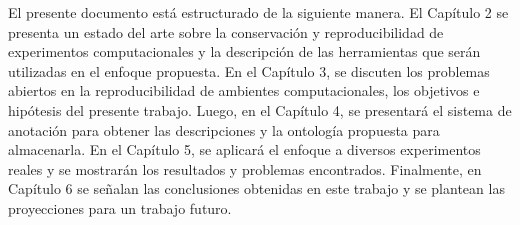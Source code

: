 El presente documento está estructurado de la siguiente manera. 
El Capítulo 2 se presenta un estado del arte sobre la conservación y reproducibilidad de experimentos computacionales y la descripción de las herramientas que serán utilizadas en el enfoque propuesta.
En el Capítulo 3, se discuten los problemas abiertos en la reproducibilidad de ambientes computacionales, los objetivos e hipótesis del presente trabajo.
Luego, en el Capítulo 4, se presentará el sistema de anotación para obtener las descripciones y la ontología propuesta para almacenarla.
En el Capítulo 5, se aplicará el enfoque a diversos experimentos reales y se mostrarán los resultados y problemas encontrados. 
Finalmente, en Capítulo 6 se señalan las conclusiones obtenidas en este trabajo y se plantean las proyecciones para un trabajo futuro.